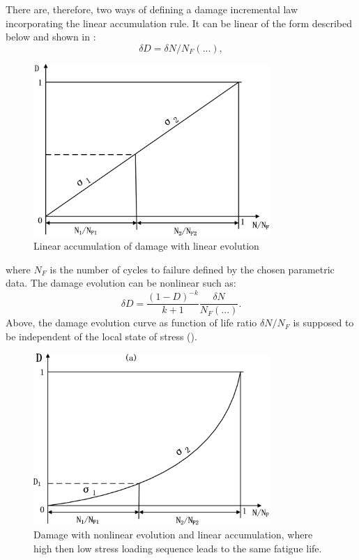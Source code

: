 There are, therefore, two ways of defining a damage incremental law incorporating the linear accumulation rule. It can be linear of the form described below and shown in :
$$\delta D= \delta N/N_F(...),$$
\begin{figure}[!h]
	\centering
	\includegraphics[width=0.8\textwidth]{figures//linearevolution.png} 
	\caption{Linear accumulation of damage with linear evolution}
	\label{linearevolution}
\end{figure}
where $N_F$ is the number of cycles to failure defined by the chosen parametric data.
The damage evolution can be nonlinear such as:
$$\delta D= \frac{(1-D)^{-k}}{k+1}\frac{\delta N}{N_F(...)}.$$
Above, the damage evolution curve as function of life ratio $\delta N/N_F$ is supposed to be independent of the local state of stress ().
\begin{figure}[!h]
	\centering
	\includegraphics[width=0.8\textwidth]{figures//linearaccumulation.png} 
	\caption{Damage with nonlinear evolution and linear accumulation, where high then low stress loading sequence leads to the same fatigue life.}
	\label{linear accumulation}
\end{figure}
